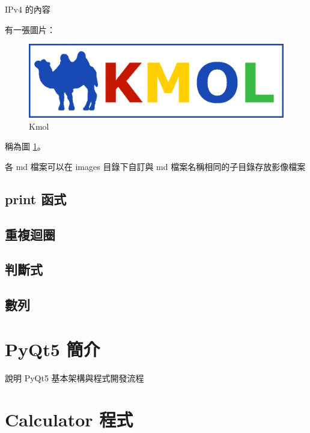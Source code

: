 \documentclass[12pt,,]{report}
\begin{document}
IPv4 的內容

有一張圖片：

\begin{figure}
\centering
\includegraphics{./tex2pdf.6656/e0ef408d9559203849a0aa26f79f9b032b709c7a.png}
\caption{Kmol\label{fig:駱駝}}
\end{figure}

稱為圖 \ref{fig:駱駝}。

各 md 檔案可以在 images 目錄下自訂與 md 檔案名稱相同的子目錄存放影像檔案

\hypertarget{print-ux51fdux5f0f}{%
\section{print 函式}\label{print-ux51fdux5f0f}}

\hypertarget{ux91cdux8907ux8ff4ux5708}{%
\section{重複迴圈}\label{ux91cdux8907ux8ff4ux5708}}

\hypertarget{ux5224ux65b7ux5f0f}{%
\section{判斷式}\label{ux5224ux65b7ux5f0f}}

\hypertarget{ux6578ux5217}{%
\section{數列}\label{ux6578ux5217}}

\hypertarget{pyqt5-ux7c21ux4ecb}{%
\chapter{PyQt5 簡介}\label{pyqt5-ux7c21ux4ecb}}

說明 PyQt5 基本架構與程式開發流程

\hypertarget{calculator-ux7a0bux5f0f}{%
\chapter{Calculator 程式}\label{calculator-ux7a0bux5f0f}}
\end{document}
